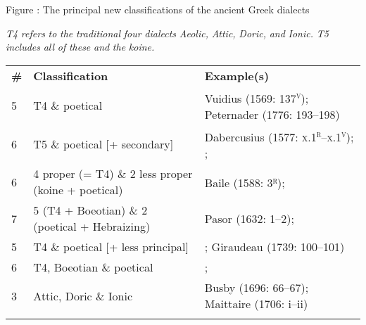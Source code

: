 \begin{stylecaption}
Figure : The principal new classifications of the ancient Greek dialects
\end{stylecaption}

\textit{T4} \textit{refers} \textit{to} \textit{the} \textit{traditional} \textit{four} \textit{dialects} \textit{Aeolic,} \textit{Attic,} \textit{Doric,} \textit{and} \textit{Ionic.} \textit{T5} \textit{includes} \textit{all} \textit{of} \textit{these} \textit{and} \textit{the} \textit{koine.}

\tablefirsthead{}

\tabletail{}
\tablelasttail{}
\begin{tabularx}{\textwidth}{XXX}
\lsptoprule

 \textbf{\#} & \textbf{Classification} & \textbf{Example(s)}\\
 5 & T4 \& poetical & Vuidius (1569: 137\textsc{\textsuperscript{v}}); Peternader (1776: 193–198)\\
 6 & T5 \& poetical [+ secondary] & Dabercusius (1577: \textsc{x.1}\textsc{\textsuperscript{r}}\textsc{–x.1}\textsc{\textsuperscript{v}}); \citet[334]{Alsted1630}; \citet[64]{Bregius1684}\\
 6 & 4 proper (= T4) \& 2 less proper (koine + poetical) & Baile (1588: 3\textsc{\textsuperscript{r}}); \citet[4]{Schmidt1604}\\
 7 & 5 (T4 + Boeotian) \& 2 (poetical + Hebraizing) & Pasor (1632: 1–2); \citet[3]{Wyss1650}\\
 5 & T4 \& poetical [+ less principal] & \citet[302]{Opitz1687}; Giraudeau (1739: 100–101)\\
 6 & T4, Boeotian \& poetical & \citet[48]{Wright1691}; \citet[121]{Holmes1735}\\
 3 & Attic, Doric \& Ionic & Busby (1696: 66–67); Maittaire (1706: i–ii)\\
\lspbottomrule
\end{tabularx}
